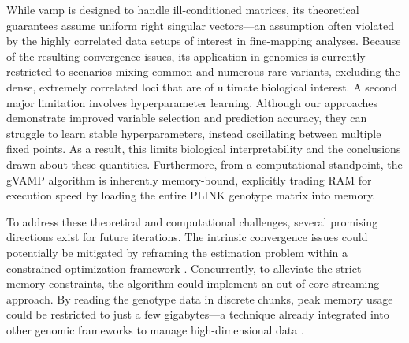 While \gls{vamp} is designed to handle ill-conditioned matrices, its theoretical guarantees assume uniform right singular vectors---an assumption often violated by the highly correlated data setups of interest in fine-mapping analyses. Because of the resulting convergence issues, its application in genomics is currently restricted to scenarios mixing common and numerous rare variants, excluding the dense, extremely correlated loci that are of ultimate biological interest. A second major limitation involves hyperparameter learning. Although our approaches demonstrate improved variable selection and prediction accuracy, they can struggle to learn stable hyperparameters, instead oscillating between multiple fixed points. As a result, this limits biological interpretability and the conclusions drawn about these quantities. Furthermore, from a computational standpoint, the gVAMP algorithm is inherently memory-bound, explicitly trading RAM for execution speed by loading the entire PLINK genotype matrix into memory.

To address these theoretical and computational challenges, several promising directions exist for future iterations. The intrinsic convergence issues could potentially be mitigated by reframing the estimation problem within a constrained optimization framework \cite{Slock2022}. Concurrently, to alleviate the strict memory constraints, the algorithm could implement an out-of-core streaming approach. By reading the genotype data in discrete chunks, peak memory usage could be restricted to just a few gigabytes---a technique already integrated into other genomic frameworks to manage high-dimensional data \cite{hof2024ldak}.



